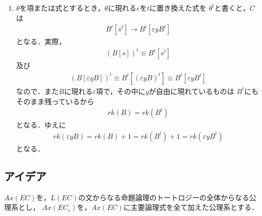 \begin{sketch}
\begin{description}
\begin{enumerate}
					\item $\theta$を項または式とするとき，$\theta$に現れる$e$を$t$に置き換えた式を
						$\theta^{t}$と書くと，$C$は
						\begin{align}
							B^{t}[s^{t}] \rightarrow B^{t}[\varepsilon y B^{t}]
						\end{align}
						となる．実際，
						\begin{align}
							(B[s])^{t} \equiv B^{t}[s^{t}]
						\end{align}
						及び
						\begin{align}
							(B[\varepsilon y B])^{t} \equiv
							B^{t}[(\varepsilon y B)^{t}] \equiv
							B^{t}[\varepsilon y B^{t}]
						\end{align}
						なので．また$B$に現れる$\varepsilon$項で，その中に$y$が自由に現れているものは
						$B^{t}$にもそのまま残っているから
						\begin{align}
							rk(B) = rk(B^{t})
						\end{align}
						となる．ゆえに
						\begin{align}
							rk(\varepsilon y B) = rk(B) + 1 = rk(B^{t}) + 1 = rk(\varepsilon y B^{t})
						\end{align}
						となる．
				\end{enumerate}
		\end{description}
	\end{sketch}
	
	
\subsection{アイデア}
	$Ax(EC)$を，$L(EC)$の文からなる命題論理のトートロジーの全体からなる公理系とし，
	$Ax(EC_{\varepsilon})$を，$Ax(EC)$に主要論理式を全て加えた公理系とする．
	
